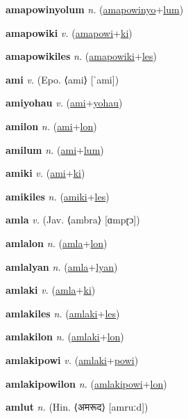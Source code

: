 \textbf{\hypertarget{amapowinyolum}{amapowinyolum}} \textit{n.} (\hyperlink{amapowinyo}{amapowinyo}+\allowbreak \hyperlink{lum}{lum})


\textbf{\hypertarget{amapowiki}{amapowiki}} \textit{v.} (\hyperlink{amapowi}{amapowi}+\allowbreak \hyperlink{ki}{ki})


\textbf{\hypertarget{amapowikiles}{amapowikiles}} \textit{n.} (\hyperlink{amapowiki}{amapowiki}+\allowbreak \hyperlink{les}{les})


\textbf{\hypertarget{ami}{ami}} \textit{v.} (Epo. ⟨ami⟩ [ˈami])


\textbf{\hypertarget{amiyohau}{amiyohau}} \textit{v.} (\hyperlink{ami}{ami}+\allowbreak \hyperlink{yohau}{yohau})


\textbf{\hypertarget{amilon}{amilon}} \textit{n.} (\hyperlink{ami}{ami}+\allowbreak \hyperlink{lon}{lon})


\textbf{\hypertarget{amilum}{amilum}} \textit{n.} (\hyperlink{ami}{ami}+\allowbreak \hyperlink{lum}{lum})


\textbf{\hypertarget{amiki}{amiki}} \textit{v.} (\hyperlink{ami}{ami}+\allowbreak \hyperlink{ki}{ki})


\textbf{\hypertarget{amikiles}{amikiles}} \textit{n.} (\hyperlink{amiki}{amiki}+\allowbreak \hyperlink{les}{les})


\textbf{\hypertarget{amla}{amla}} \textit{v.} (Jav. ⟨ambra⟩ [ɑmpɽɔ])


\textbf{\hypertarget{amlalon}{amlalon}} \textit{n.} (\hyperlink{amla}{amla}+\allowbreak \hyperlink{lon}{lon})


\textbf{\hypertarget{amlalyan}{amlalyan}} \textit{n.} (\hyperlink{amla}{amla}+\allowbreak \hyperlink{lyan}{lyan})


\textbf{\hypertarget{amlaki}{amlaki}} \textit{v.} (\hyperlink{amla}{amla}+\allowbreak \hyperlink{ki}{ki})


\textbf{\hypertarget{amlakiles}{amlakiles}} \textit{n.} (\hyperlink{amlaki}{amlaki}+\allowbreak \hyperlink{les}{les})


\textbf{\hypertarget{amlakilon}{amlakilon}} \textit{n.} (\hyperlink{amlaki}{amlaki}+\allowbreak \hyperlink{lon}{lon})


\textbf{\hypertarget{amlakipowi}{amlakipowi}} \textit{v.} (\hyperlink{amlaki}{amlaki}+\allowbreak \hyperlink{powi}{powi})


\textbf{\hypertarget{amlakipowilon}{amlakipowilon}} \textit{n.} (\hyperlink{amlakipowi}{amlakipowi}+\allowbreak \hyperlink{lon}{lon})


\textbf{\hypertarget{amlut}{amlut}} \textit{n.} (Hin. ⟨{\devanagari{}अमरूद}⟩ [amruːd])


